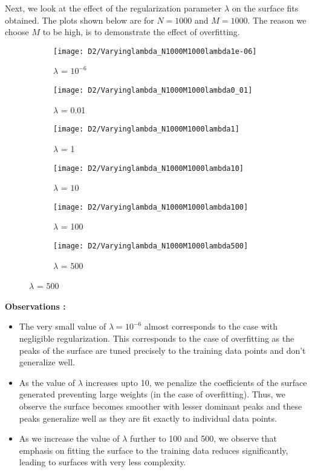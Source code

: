 \documentclass{article}
\begin{document}
\begin{flushleft}
Next, we look at the effect of the regularization parameter $\lambda$ on the surface fits obtained. The plots shown below are for $N = 1000$ and $M = 1000$. The reason we choose $M$ to be high, is to demonstrate the effect of overfitting.

\end{flushleft}

\begin{figure}[H]

\begin{subfigure}{.5\textwidth}
\centering
\texttt{[image: D2/Varyinglambda\_N1000M1000lambda1e-06]}
\caption{$\lambda$ = $10^{-6}$}
\end{subfigure}
\begin{subfigure}{.5\textwidth}
\texttt{[image: D2/Varyinglambda\_N1000M1000lambda0\_01]}
\caption{$\lambda$ = 0.01}
\end{subfigure}


\begin{subfigure}{.5\textwidth}
\centering
\texttt{[image: D2/Varyinglambda\_N1000M1000lambda1]}
\caption{$\lambda$ = 1}
\end{subfigure}
\begin{subfigure}{.5\textwidth}
\texttt{[image: D2/Varyinglambda\_N1000M1000lambda10]}
\caption{$\lambda$ = $10$}
\end{subfigure}

\begin{subfigure}{.5\textwidth}
\centering
\texttt{[image: D2/Varyinglambda\_N1000M1000lambda100]}
\caption{$\lambda$ = 100}
\end{subfigure}
\begin{subfigure}{.5\textwidth}
\texttt{[image: D2/Varyinglambda\_N1000M1000lambda500]}
\caption{$\lambda$ = $500$}
\end{subfigure}

\end{figure}


\textbf{Observations :}

\begin{itemize}
\item The very small value of $\lambda=10^{-6}$ almost corresponds to the case with negligible regularization. This corresponds to the case of overfitting as the peaks of the surface are tuned precisely to the training data points and don't generalize well.
\item As the value of $\lambda$ increases upto 10, we penalize the coefficients of the surface generated preventing large weights (in the case of overfitting). Thus, we observe the surface becomes smoother with lesser dominant peaks and these peaks generalize well as they are fit exactly to individual data points.
\item As we increase the value of $\lambda$ further to 100 and 500, we observe that emphasis on fitting the surface to the training data reduces significantly, leading to surfaces with very less complexity.
\end{itemize}
\end{document}
